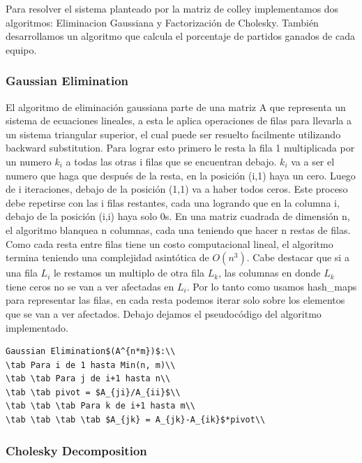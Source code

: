 Para resolver el sistema planteado por la matriz de colley implementamos dos algoritmos: Eliminacion Gaussiana y Factorización de Cholesky. También desarrollamos un algoritmo que calcula el porcentaje de partidos ganados de cada equipo. 

\subsubsection{Gaussian Elimination}

El algoritmo de eliminación gaussiana parte de una matriz A que representa un sistema de ecuaciones lineales, a esta le aplica operaciones de filas para llevarla a un sistema triangular superior, el cual puede ser resuelto facilmente utilizando backward substitution. Para lograr esto primero le resta la fila 1 multiplicada por un numero $k_i$ a todas las otras i filas que se encuentran debajo. $k_i$ va a ser el numero que haga que después de la resta, en la posición (i,1) haya un cero. Luego de i iteraciones, debajo de la posición (1,1) va a haber todos ceros. Este proceso debe repetirse con las i filas restantes, cada una logrando que en la columna i, debajo de la posición (i,i) haya solo 0s. En una matriz cuadrada de dimensión n, el algoritmo blanquea n columnas, cada una teniendo que hacer n restas de filas. Como cada resta entre filas tiene un costo computacional lineal, el algoritmo termina teniendo una complejidad asintótica de $O(n^3)$. Cabe destacar que si a una fila $L_i$ le restamos un multiplo de otra fila $L_k$, las columnas en donde $L_k$ tiene ceros no se van a ver afectadas en $L_i$. Por lo tanto como usamos hash_maps para representar las filas, en cada resta podemos iterar solo sobre los elementos que se van a ver afectados. Debajo dejamos el pseudocódigo del algoritmo implementado.

\begin{verbatim}
Gaussian Elimination$(A^{n*m})$:\\
\tab Para i de 1 hasta Min(n, m)\\
\tab \tab Para j de i+1 hasta n\\
\tab \tab pivot = $A_{ji}/A_{ii}$\\
\tab \tab \tab Para k de i+1 hasta m\\
\tab \tab \tab \tab $A_{jk} = A_{jk}-A_{ik}$*pivot\\

\end{verbatim}

\subsubsection{Cholesky Decomposition}

